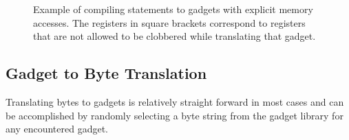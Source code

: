     \begin{figure}
        \centering
        \caption[Example of compiling statements to gadgets with explicit memory
        accesses.]{Example of compiling statements to gadgets with explicit memory
        accesses. The registers in square brackets correspond to registers that
        are not allowed to be clobbered while translating that gadget.}
        \label{fig:method-direct-to-gadget}
    \end{figure}

    \subsection{Gadget to Byte Translation}

    Translating bytes to gadgets is relatively straight forward in most cases
    and can be accomplished by randomly selecting a byte string from the gadget
    library for any encountered gadget.

